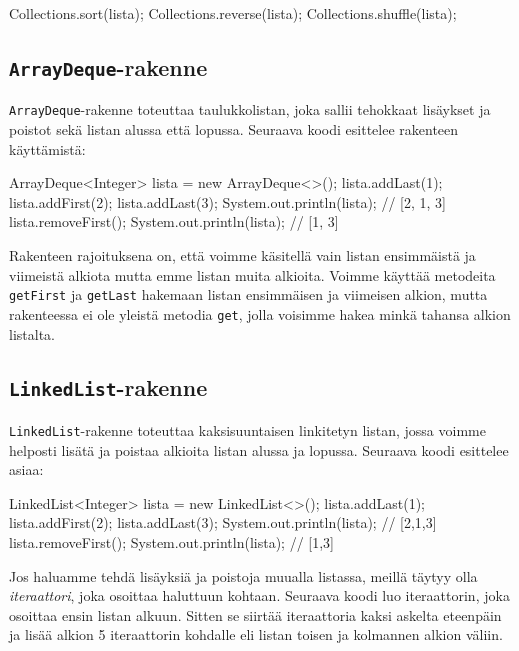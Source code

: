\begin{code}
Collections.sort(lista);
Collections.reverse(lista);
Collections.shuffle(lista);
\end{code}

\subsection{\texttt{ArrayDeque}-rakenne}

\texttt{ArrayDeque}-rakenne toteuttaa taulukkolistan,
joka sallii tehokkaat lisäykset ja poistot
sekä listan alussa että lopussa.
Seuraava koodi esittelee rakenteen käyttämistä:

\begin{code}
ArrayDeque<Integer> lista = new ArrayDeque<>();
lista.addLast(1);
lista.addFirst(2);
lista.addLast(3);
System.out.println(lista); // [2, 1, 3]
lista.removeFirst();
System.out.println(lista); // [1, 3]
\end{code}

Rakenteen rajoituksena on, että voimme käsitellä
vain listan ensimmäistä ja viimeistä alkiota mutta
emme listan muita alkioita.
Voimme käyttää metodeita \texttt{getFirst} ja \texttt{getLast}
hakemaan listan ensimmäisen ja viimeisen alkion,
mutta rakenteessa ei ole yleistä metodia \texttt{get},
jolla voisimme hakea minkä tahansa alkion listalta.

\subsection{\texttt{LinkedList}-rakenne}

\texttt{LinkedList}-rakenne toteuttaa kaksisuuntaisen
linkitetyn listan, jossa voimme helposti lisätä ja poistaa
alkioita listan alussa ja lopussa.
Seuraava koodi esittelee asiaa:

\begin{code}
LinkedList<Integer> lista = new LinkedList<>();
lista.addLast(1);
lista.addFirst(2);
lista.addLast(3);
System.out.println(lista); // [2,1,3]
lista.removeFirst();
System.out.println(lista); // [1,3]
\end{code}

Jos haluamme tehdä lisäyksiä ja poistoja muualla listassa,
meillä täytyy olla \emph{iteraattori}, joka osoittaa haluttuun kohtaan.
Seuraava koodi luo iteraattorin, joka osoittaa ensin listan alkuun.
Sitten se siirtää iteraattoria kaksi askelta eteenpäin ja
lisää alkion 5 iteraattorin kohdalle eli listan
toisen ja kolmannen alkion väliin.

